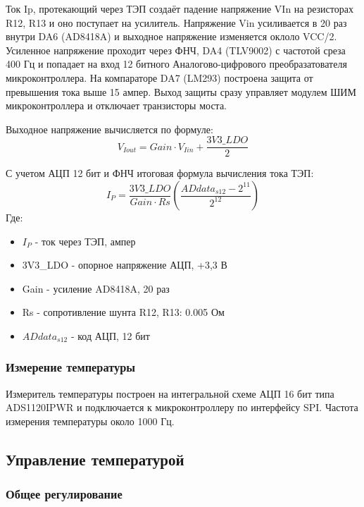 Ток Ip, протекающий через ТЭП создаёт падение напряжение VIn на резисторах R12, R13 и оно поступает на усилитель.
Напряжение Vin усиливается в 20 раз внутри DA6 (AD8418A) и выходное напряжение изменяется оклоло VCC/2.
Усиленное напряжение проходит через ФНЧ, DA4 (TLV9002) с частотой среза 400 Гц и попадает на вход 12 битного
Аналогово-цифрового преобразатователя микроконтроллера. На компараторе DA7 (LM293) построена защита
от превышения тока выше 15 ампер. Выход защиты сразу управляет модулем ШИМ микроконтроллера и отключает
транзисторы моста.

Выходное напряжение вычисляется по формуле:
\begin{equation}
    V_{Iout} = Gain \cdot V_{Iin} + \frac{3V3\_LDO}{2}
\end{equation}

С учетом АЦП 12 бит и ФНЧ итоговая формула вычисления тока ТЭП:
\begin{equation}
    I_P = \frac{3V3\_LDO}{Gain \cdot Rs} \left(\frac{ADdata_{s12} - 2^{11}}{2^{12}}\right)    
\end{equation}
Где:
\begin{itemize}[label={}]
    \item $I_P$ - ток через ТЭП, ампер
    \item 3V3\_LDO - опорное напряжение АЦП, +3,3 В
    \item Gain - усиление AD8418A, 20 раз
    \item Rs - сопротивление шунта R12, R13: 0.005 Ом
    \item $ADdata_{s12}$ - код АЦП, 12 бит
\end{itemize}

\subsubsection{Измерение температуры}

Измеритель температуры построен на интегральной схеме АЦП 16 бит типа ADS1120IPWR и подключается к микроконтроллеру по интерфейсу
SPI. Частота измерения температуры около 1000 Гц.

\subsection{Управление температурой}
\subsubsection{Общее регулирование}


